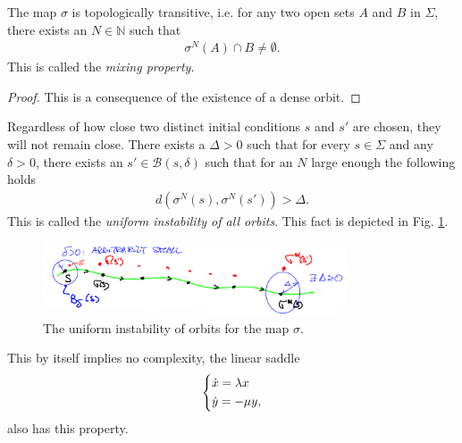 \begin{proposition}[]
	The map $\sigma$ is topologically transitive, i.e. for any two open sets $A$ and $B$ in $\Sigma$, there exists an $N \in \mathbb{N}$ such that
	\begin{align}
		\sigma^{N}(A) \cap B \neq \emptyset.
	\end{align}
	This is called the \emph{mixing property}.
\end{proposition}
\begin{proof}
	This is a consequence of the existence of a dense orbit.
\end{proof}

\begin{proposition}
	Regardless of how close two distinct initial conditions $s$ and $s'$ are chosen, they will not remain close. There exists a $\Delta>0$ such that for every $s\in\Sigma$ and any $\delta>0$, there exists an $s' \in \mathcal{B}\left(s, \delta\right)$ such that for an $N$ large enough the following holds
	\begin{align}
		d(\sigma^{N}(s), \sigma^{N}(s') ) > \Delta.
	\end{align}
	This is called the \emph{uniform instability of all orbits}. This fact is depicted in Fig. \ref{fig:unif_instab}.	
\end{proposition}

\begin{figure}[h!]
	\centering
	\includegraphics[width=0.8\textwidth]{figures/ch6/22unif_instab.png}
	\caption{The uniform instability of orbits for the map $\sigma$.}
	\label{fig:unif_instab}
\end{figure}

\begin{remark}[]
	This by itself implies no complexity, the linear saddle
	\begin{align}
		\begin{dcases}
			\dot{x} = \lambda x \\
			\dot{y} = - \mu y,
		\end{dcases}
	\end{align}
also has this property.	
\end{remark}

